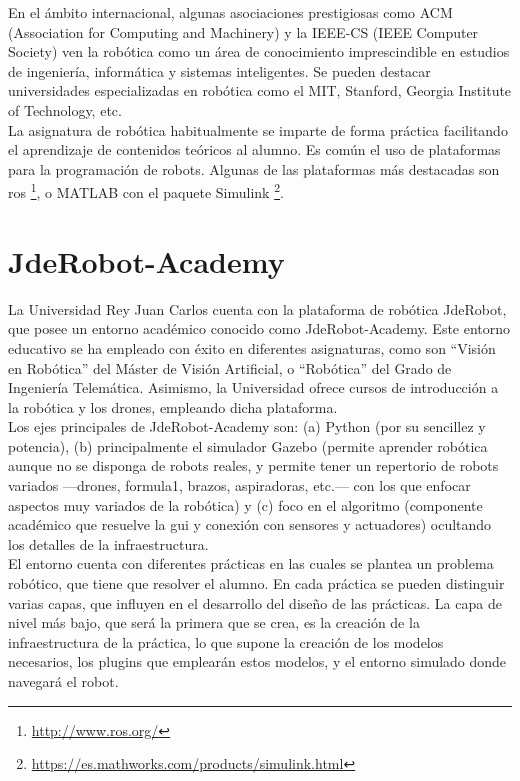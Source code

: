 En el ámbito internacional, algunas asociaciones prestigiosas como ACM (Association for Computing and Machinery) y la IEEE-CS (IEEE Computer Society) ven la robótica como un área de conocimiento imprescindible en estudios de ingeniería, informática y sistemas inteligentes. Se pueden destacar universidades especializadas en robótica como el MIT, Stanford, Georgia Institute of Technology, etc.\\

La asignatura de robótica habitualmente se imparte de forma práctica facilitando el aprendizaje de contenidos teóricos al alumno. Es común el uso de plataformas para la programación de robots. Algunas de las plataformas más destacadas son \acrshort{ros} \footnote{\url{http://www.ros.org/}}, o MATLAB con el paquete Simulink \footnote{\url{https://es.mathworks.com/products/simulink.html}}.

\section{JdeRobot-Academy}
La Universidad Rey Juan Carlos cuenta con la plataforma de robótica JdeRobot, que posee un entorno académico conocido como JdeRobot-Academy. Este entorno educativo se ha empleado con éxito en diferentes asignaturas, como son ``Visión en Robótica'' del Máster de Visión Artificial, o ``Robótica'' del Grado de Ingeniería Telemática. Asimismo, la Universidad ofrece cursos de introducción a la robótica y los drones, empleando dicha plataforma.\\

Los ejes principales de JdeRobot-Academy son: (a) Python (por su sencillez y potencia), (b) principalmente el simulador Gazebo (permite aprender robótica aunque no se disponga de robots reales, y permite tener un repertorio de robots variados ---drones, formula1, brazos, aspiradoras, etc.--- con los que enfocar aspectos muy variados de la robótica) y (c) foco en el algoritmo (componente académico que resuelve la \acrfull{gui} y conexión con sensores y actuadores) ocultando los detalles de la infraestructura.\\


El entorno cuenta con diferentes prácticas en las cuales se plantea un problema robótico, que tiene que resolver el alumno. En cada práctica se pueden distinguir varias capas, que influyen en el desarrollo del diseño de las prácticas. La capa de nivel más bajo, que será la primera que se crea, es la creación de la infraestructura de la práctica, lo que supone la creación de los modelos necesarios, los plugins que emplearán estos modelos, y el entorno simulado donde navegará el robot. \\

